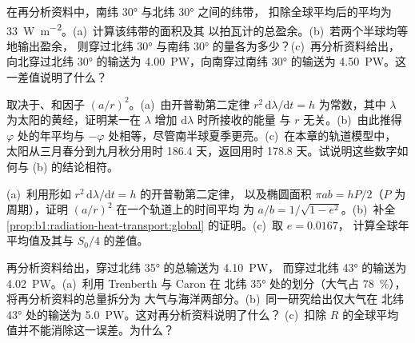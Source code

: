 \begin{exercise}[$\star\star$]\label{exo:b1:radiation-heat-transport:9}
在再分析资料中，南纬 \ang{30} 与北纬 \ang{30} 之间的纬带，
扣除全球平均后的平均为 \qty{+33}{W.m^{-2}}。(a)~计算该纬带的面积及其
以拍瓦计的总盈余。(b)~若两个半球均等地输出盈余，
则穿过北纬 \ang{30}
与南纬 \ang{30} 的量各为多少？(c)~再分析资料给出，向北穿过北纬 \ang{30}
的输送为 \qty{4.00}{PW}，向南穿过南纬 \ang{30} 的输送为 \qty{4.50}{PW}。这一差值说明了什么？
\end{exercise}

\begin{exercise}[$\star\star\star$]\label{exo:b1:radiation-heat-transport:10}
取决于、和因子
$(a/r)^2$。(a)~由开普勒第二定律 $r^2\,\mathrm d\lambda/\mathrm dt = h$
为常数，其中 $\lambda$ 为太阳的黄经，证明某一在
$\lambda$ 增加 $\mathrm d\lambda$ 时所接收的能量
与 $r$ 无关。(b)~由此推得 $\varphi$ 处的年平均与
 $-\varphi$ 处相等，尽管南半球夏季更亮。(c)~在本章的轨道模型中，
太阳从三月春分到九月秋分用时 \num{186.4} 天，返回用时
\num{178.8} 天。试说明这些数字如何与 (b) 的结论相符。
\end{exercise}

\begin{exercise}[$\star\star\star$]\label{exo:b1:radiation-heat-transport:11}
(a)~利用形如 $r^2\,\mathrm d\lambda/\mathrm dt = h$ 的开普勒第二定律，
以及椭圆面积 $\pi a b = hP/2$（$P$ 为周期），证明 $(a/r)^2$ 在一个轨道上的时间平均
为 $a/b = 1/\sqrt{1 - e^2}$。(b)~补全
\cref{prop:b1:radiation-heat-transport:global} 的证明。(c)~取 $e = 0.0167$，
计算全球年平均值及其与 $S_0/4$ 的差值。
\end{exercise}

\begin{exercise}[$\star\star\star$]\label{exo:b1:radiation-heat-transport:12}
再分析资料给出，穿过北纬 \ang{35} 的总输送为 \qty{4.10}{PW}，
而穿过北纬 \ang{43} 的输送为 \qty{4.02}{PW}。(a)~利用 Trenberth 与 Caron 在
北纬 \ang{35} 处的划分（大气占 \qty{78}{\percent}），将再分析资料的总量拆分为
大气与海洋两部分。(b)~同一研究给出仅大气在
北纬 \ang{43} 处的输送为 \qty{5.0}{PW}。这对再分析资料说明了什么？
(c)~扣除 $R$ 的全球平均值并不能消除这一误差。为什么？
\end{exercise}

